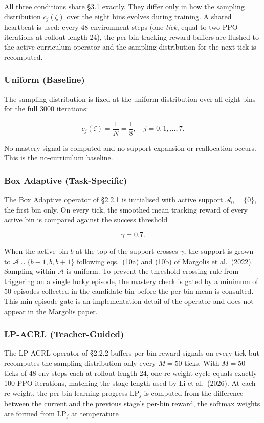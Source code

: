 All three conditions share \S3.1 exactly. They differ only in how the sampling distribution $c_j(\zeta)$ over the eight bins evolves during training. A shared heartbeat is used: every 48 environment steps (one \textit{tick}, equal to two PPO iterations at rollout length 24), the per-bin tracking reward buffers are flushed to the active curriculum operator and the sampling distribution for the next tick is recomputed.

\subsubsection{Uniform (Baseline)}

The sampling distribution is fixed at the uniform distribution over all eight bins for the full 3000 iterations:

\[
c_j(\zeta) = \frac{1}{N} = \frac{1}{8}, \quad j = 0, 1, \ldots, 7.
\]

No mastery signal is computed and no support expansion or reallocation occurs. This is the no-curriculum baseline.

\subsubsection{Box Adaptive (Task-Specific)}

The Box Adaptive operator of \S2.2.1 is initialised with active support $\mathcal{A}_0 = \{0\}$, the first bin only. On every tick, the smoothed mean tracking reward of every active bin is compared against the success threshold

\[
\gamma = 0.7.
\]

When the active bin $b$ at the top of the support crosses $\gamma$, the support is grown to $\mathcal{A} \cup \{b-1, b, b+1\}$ following eqs.\ (10a) and (10b) of Margolis et al.\ (2022). Sampling within $\mathcal{A}$ is uniform. To prevent the threshold-crossing rule from triggering on a single lucky episode, the mastery check is gated by a minimum of 50 episodes collected in the candidate bin before the per-bin mean is consulted. This min-episode gate is an implementation detail of the operator and does not appear in the Margolis paper.

\subsubsection{LP-ACRL (Teacher-Guided)}

The LP-ACRL operator of \S2.2.2 buffers per-bin reward signals on every tick but recomputes the sampling distribution only every $M = 50$ ticks. With $M = 50$ ticks of 48 env steps each at rollout length 24, one re-weight cycle equals exactly 100 PPO iterations, matching the stage length used by Li et al.\ (2026). At each re-weight, the per-bin learning progress $\mathrm{LP}_j$ is computed from the difference between the current and the previous stage's per-bin reward, the softmax weights are formed from $\mathrm{LP}_j$ at temperature

